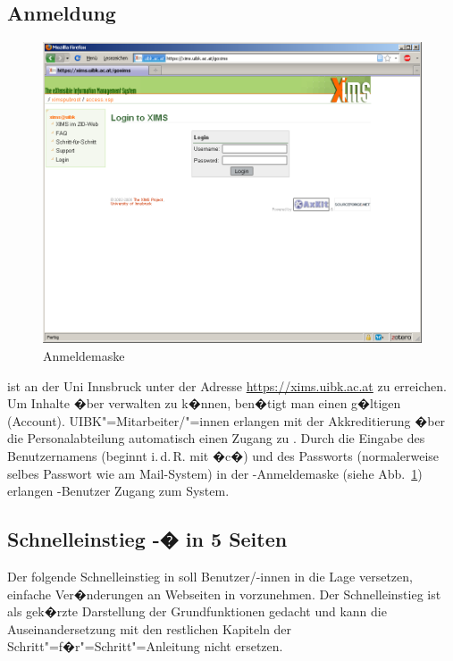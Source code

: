 \subsection{Anmeldung}
\label{anmeldung}

\begin{figure}[H]
  \centering
  \includegraphics[width=1.00\textwidth]{./images/xims-login.png}
  \caption{ Anmeldemaske}
  \label{fig:xims-login}
\end{figure}

 ist an der Uni Innsbruck unter der Adresse
\url{https://xims.uibk.ac.at} zu erreichen. Um Inhalte �ber
 verwalten zu k�nnen, ben�tigt man einen g�ltigen
 (Account). UIBK"=Mitarbeiter/"=innen
erlangen mit der Akkreditierung �ber die Personalabteilung automatisch
einen Zugang zu . Durch die Eingabe des Benutzernamens
(beginnt i.\,d.\,R. mit �c�) und des Passworts (normalerweise selbes
Passwort wie am Mail-System) in der -Anmeldemaske
(siehe Abb.~\ref{fig:xims-login}) erlangen -Benutzer
Zugang zum System.

\subsection{Schnelleinstieg -�  in 5 Seiten}
\label{schnelleinstieg}

Der folgende Schnelleinstieg in  soll Benutzer/-innen
in die Lage versetzen, einfache Ver�nderungen an Webseiten in
 vorzunehmen. Der Schnelleinstieg ist als gek�rzte
Darstellung der Grundfunktionen gedacht und kann die
Auseinandersetzung mit den restlichen Kapiteln der
Schritt"=f�r"=Schritt"=Anleitung nicht ersetzen.


